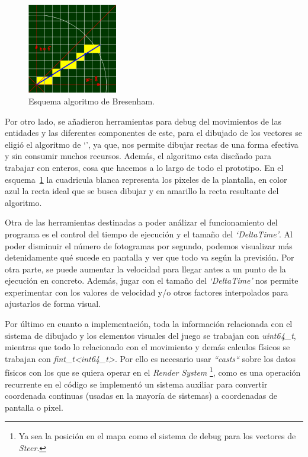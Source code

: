\begin{figure}[ht]
\centering
\includegraphics[width=0.35\textwidth]{imagenes/diario_desarrollo/linea_ideal.png}
\caption{Esquema algoritmo de Bresenham.}
\label{fig:bresenham}
\end{figure} 

Por otro lado, se añadieron herramientas para debug del movimientos de las entidades y las
diferentes componentes de este, para el dibujado de los vectores se eligió el algoritmo de
`\citeauthor*{Bresenham1962}', ya que, nos permite dibujar rectas de una forma efectiva
y sin consumir muchos recursos. Además, el algoritmo esta diseñado para trabajar con enteros,
cosa que hacemos a lo largo de todo el prototipo. En el esquema~\ref{fig:bresenham} la 
cuadricula blanca representa los pixeles de la plantalla, en color azul la recta ideal que
se busca dibujar y en amarillo la recta resultante del algoritmo.

Otra de las herramientas destinadas a poder análizar el funcionamiento del programa es
el control del tiempo de ejecución y el tamaño del \textit{`DeltaTime'}. Al poder disminuir
el número de fotogramas por segundo, podemos visualizar más detenidamente qué sucede en
pantalla y ver que todo va según la previsión. Por otra parte, se puede aumentar la velocidad
para llegar antes a un punto de la ejecución en concreto. Además, jugar con el tamaño del
\textit{`DeltaTime'} nos permite experimentar con los valores de velocidad y/o otros factores
interpolados para ajustarlos de forma visual. 

Por último en cuanto a implementación, toda la información relacionada con el sistema de 
dibujado y los elementos visuales del juego se trabajan con \textit{uint64\_t}, mientras que
todo lo relacionado con el movimiento y demás calculos físicos se trabajan con
\textit{fint\_t\textless int64\_t\textgreater}. Por ello es necesario usar \textit{``casts``}
sobre los datos físicos con los que se quiera operar en el \textit{Render System}
\footnote{Ya sea la posición en el mapa como el sistema de debug para los vectores de
\textit{Steer}.}, como es una operación recurrente en el código se implementó un sistema 
auxiliar para convertir coordenada continuas (usadas en la mayoría de sistemas) a coordenadas de 
pantalla o pixel. 


